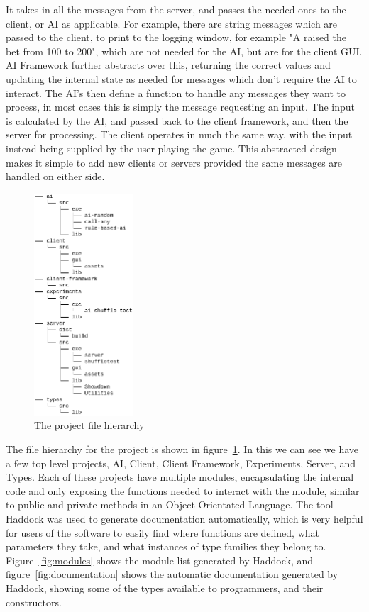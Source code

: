It takes in all the messages from the
server, and passes the needed ones to the client, or AI as applicable. For
example, there are string messages which are passed to the client, to print
to the logging window, for example "A raised the bet from 100 to 200", which
are not needed for the AI, but are for the client GUI\@. AI Framework further
abstracts over this, returning the correct values and updating the internal
state as needed for messages which don't require the AI to interact. The AI's
then define a function to handle any messages they want to process, in most
cases this is simply the message requesting an input. The input is calculated
by the AI,
and passed back to the client framework, and then the server for processing.
The client operates in much the same way, with the input instead being supplied
by the user playing the game. This abstracted design makes it simple to
add new clients or servers provided the same messages are handled on either
side.

\begin{figure}
    \begin{center}
        \includegraphics[width=0.33\textwidth]{../images/hierarchy.png}
    \end{center}
\caption{The project file hierarchy}
\label{fig:hierarchy}
\end{figure}

The file hierarchy for the project is shown in figure~\ref{fig:hierarchy}.
In this we can see we have a few top level projects, AI, Client,
Client Framework, Experiments, Server, and Types. Each of these projects have
multiple modules, encapsulating the internal code and only exposing the
functions needed to interact with the module, similar to public and private
methods in an Object Orientated Language. The tool Haddock \parencite{marlow2002}
was used to generate documentation automatically, which is very helpful for
users of the software to easily find where functions are defined, what parameters
they take, and what instances of type families they belong to. Figure~\ref{fig:modules}
shows the module list generated by Haddock, and figure~\ref{fig:documentation}
shows the automatic documentation generated by Haddock, showing some of the
types available to programmers, and their constructors.

